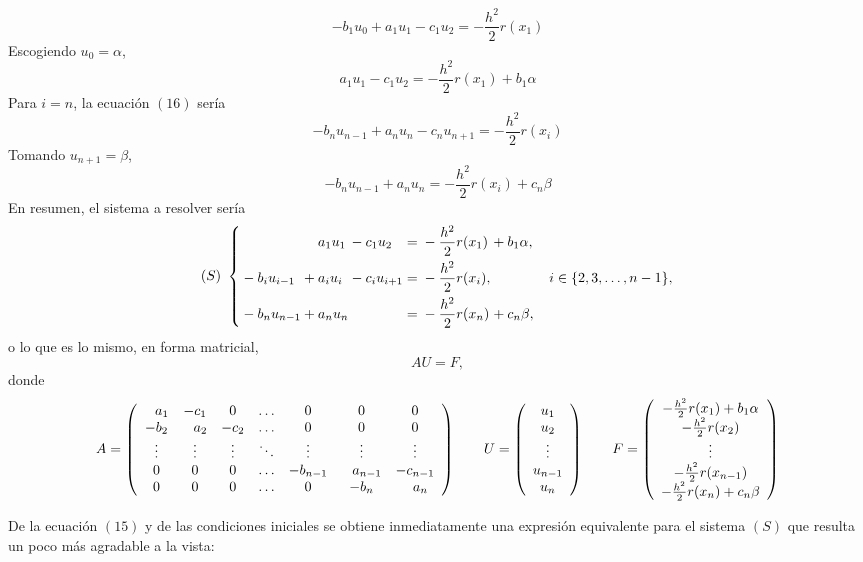 \documentclass[11pt]{report}
\theoremstyle{mytheorem}
\theoremstyle{mydefinition}
\theoremstyle{myexample}
\begin{document}
\[-b_1u_0+a_1u_1-c_1u_2=-\frac{h^2}{2}r(x_1)\]
Escogiendo $u_0 = \alpha$,
\[a_1u_1-c_1u_2=-\frac{h^2}{2}r(x_1)+b_1\alpha\]
Para $i=n$, la ecuación $(16)$ sería
\[-b_nu_{n-1}+a_nu_n-c_nu_{n+1} = -\frac{h^2}{2}r(x_i)\]
Tomando $u_{n+1} = \beta$,
\[-b_nu_{n-1}+a_nu_n = -\frac{h^2}{2}r(x_i)+c_n\beta\]
En resumen, el sistema a resolver sería
\[
(S) \ \left\{ \begin{alignedat}{6}
&             &       & a_1u_1 & {}-{} & c_1u_2 & {}={} & -\frac{h^2}{2}r(x_1) & {}+{} & b_1\alpha, \\
& -b_iu_{i-1} & {}+{} & a_iu_i & {}-{} & c_iu_{i+1} & {}={} & -\frac{h^2}{2}r(x_i), & & \quad \quad \quad i \in \{2,3,\mathellipsis,n-1\}, \\
& -b_nu_{n-1} & {}+{} & a_nu_n & & & {}={} & -\frac{h^2}{2}r(x_n) & {}+{} & c_n\beta, \\
\end{alignedat} \right.
\]
o lo que es lo mismo, en forma matricial,
\[AU = F,\]
donde 
\[A = \left(\begin{array}{ccccccc}
    \phantom{-}a_1 & -c_1 & 0 & \mathellipsis & 0 & 0 & 0 \\
    -b_2 & \phantom{-}a_2 & -c_2 & \mathellipsis & 0 & 0 & 0 \\
    \vdots & \vdots & \vdots & \ddots & \vdots & \vdots & \vdots \\
    0 & 0 & 0 & \mathellipsis & -b_{n-1} & \phantom{-}a_{n-1} & -c_{n-1} \\
    0 & 0 & 0 & \mathellipsis & 0 & -b_n & \phantom{-}a_n \\
\end{array}\right) \qquad U = \left(\begin{array}{c}
    u_1 \\
    u_2 \\
    \vdots \\
    u_{n-1} \\
    u_n
\end{array}\right) \qquad F = \left(\begin{array}{c}
    -\frac{h^2}{2}r(x_1)+b_1\alpha \\
    -\frac{h^2}{2}r(x_2) \\
    \vdots \\
    -\frac{h^2}{2}r(x_{n-1}) \\
    -\frac{h^2}{2}r(x_n)+c_n\beta
\end{array}\right)\]

De la ecuación $(15)$ y de las condiciones iniciales se obtiene inmediatamente una expresión equivalente para el sistema $(S)$ que resulta un poco más agradable a la vista:
\end{document}
